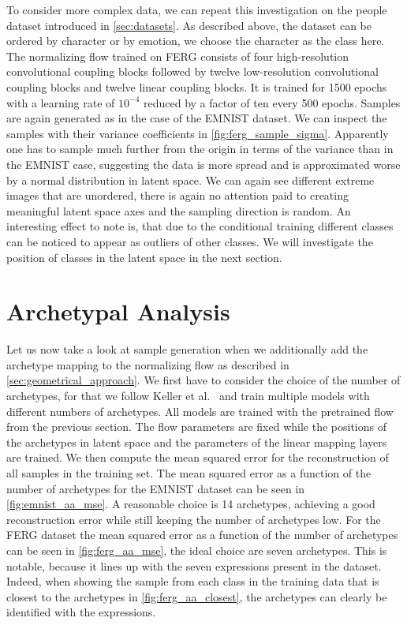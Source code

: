 To consider more complex data, we can repeat this investigation on the people
dataset introduced in \autoref{sec:datasets}. As described above, the dataset
can be ordered by character or by emotion, we choose the character as the class
here. The normalizing flow trained on FERG consists of four high-resolution
convolutional coupling blocks followed by twelve low-resolution convolutional
coupling blocks and twelve linear coupling blocks. It is trained for 1500
epochs with a learning rate of $10^{-4}$ reduced by a factor of ten every 500
epochs. Samples are again generated as in the case of the EMNIST dataset. We
can inspect the samples with their variance coefficients in
\autoref{fig:ferg_sample_sigma}. Apparently one has to sample
much further from the origin in terms of the variance than in the EMNIST case,
suggesting the data is more spread and is approximated worse by a normal
distribution in latent space. We can again see different extreme images that
are unordered, there is again no attention paid to creating meaningful
latent space axes and the sampling direction is random. An interesting effect
to note is, that due to the conditional training different classes can be
noticed to appear as outliers of other classes. We will investigate the
position of classes in the latent space in the next section.

\section{Archetypal Analysis}%
\label{sec:archetypal_analysis}

Let us now take a look at sample generation when we additionally add the
archetype mapping to the normalizing flow as described in
\autoref{sec:geometrical_approach}. We first have to consider the choice of the
number of archetypes, for that we follow Keller et
al.~\citep{kellerLearningExtremalRepresentations2020} and train multiple models
with different numbers of archetypes. All models are trained with the
pretrained flow from the previous section. The flow parameters are fixed while
the positions of the archetypes in latent space and the parameters of the
linear mapping layers are trained. We then compute
the mean squared error for the reconstruction of all samples in the training
set. The mean squared error as a function of the number of archetypes for the
EMNIST dataset can be seen in \autoref{fig:emnist_aa_mse}. A reasonable choice
is 14 archetypes, achieving a good reconstruction error while still keeping the
number of archetypes low. For the FERG dataset the mean squared error as a
function of the number of archetypes can be seen in \autoref{fig:ferg_aa_mse},
the ideal choice are seven archetypes. This is notable, because it lines up
with the seven expressions present in the dataset. Indeed,
when showing the sample from each class in the training data that is closest to
the archetypes in \autoref{fig:ferg_aa_closest}, the archetypes can clearly be
identified with the expressions.

